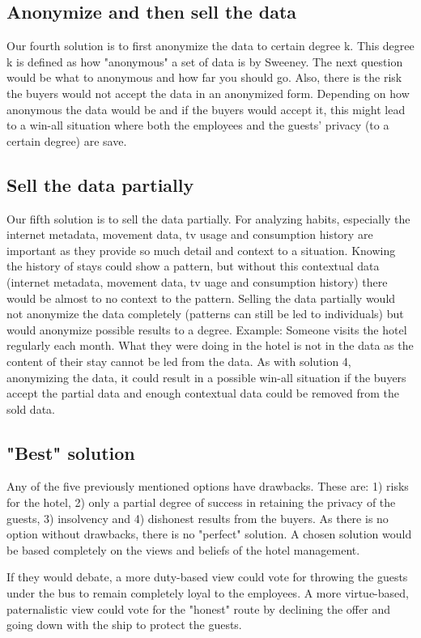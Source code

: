 \subsection{Anonymize and then sell the data}
Our fourth solution is to first anonymize the data to certain degree k. This degree k is defined as how "anonymous" a set of data is by Sweeney\cite{k_anonymity}. The next question would be what to anonymous and how far you should go. Also, there is the risk the buyers would not accept the data in an anonymized form. Depending on how anonymous the data would be and if the buyers would accept it, this might lead to a win-all situation where both the employees and the guests' privacy (to a certain degree) are save.

\subsection{Sell the data partially}
Our fifth solution is to sell the data partially. For analyzing habits, especially the internet metadata, movement data, tv usage and consumption history are important as they provide so much detail and context to a situation. Knowing the history of stays could show a pattern, but without this contextual data (internet metadata, movement data, tv uage and consumption history) there would be almost to no context to the pattern. Selling the data partially would not anonymize the data completely (patterns can still be led to individuals) but would anonymize possible results to a degree. Example: Someone visits the hotel regularly each month. What they were doing in the hotel is not in the data as the content of their stay cannot be led from the data. As with solution 4, anonymizing the data, it could result in a possible win-all situation if the buyers accept the partial data and enough contextual data could be removed from the sold data.

\subsection{"Best" solution} 
Any of the five previously mentioned options have drawbacks. These are: 1) risks for the hotel, 2) only a partial degree of success in retaining the privacy of the guests, 3) insolvency and 4) dishonest results from the buyers. As there is no option without drawbacks, there is no "perfect" solution. A chosen solution would be based completely on the views and beliefs of the hotel management.

If they would debate, a more duty-based view could vote for throwing the guests under the bus to remain completely loyal to the employees. A more virtue-based, paternalistic view could vote for the "honest" route by declining the offer and going down with the ship to protect the guests.

